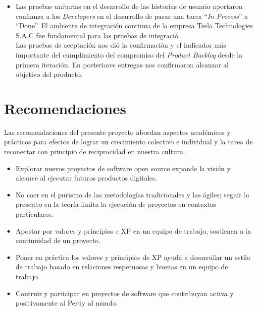 \begin{spacing}{1.5}
\begin{itemize}
	\item Las pruebas unitarias en el desarrollo de las historias de usuario aportaron confianza a los \textit{Developers} en el desarrollo de pasar una tarea ``\textit{In Process}'' a ``Done''. El ambiente de integraci\'{o}n continua de la empresa Tesla Technologies S.A.C fue fundamental para las pruebas de integraci\'{o}.\\
	Las pruebas de aceptaci\'{o}n nos di\'{o} la confirmaci\'{o}n y el indicador m\'{a}s importante del cumplimiento del compromiso del \textit{Product Backlog} desde la primera iteraci\'{o}n. En posteriores entregas nos confirmaron alcanzar al objetivo del producto.
	
\end{itemize}
\clearpage
\section{Recomendaciones}
	Las recomendaciones del presente proyecto abordan aspectos acad\'{e}micos y pr\'{a}cticos para efectos de lograr un crecimiento colectivo e individual y la tarea de reconectar con principio de reciprocidad en nuestra cultura.
	
	\begin{itemize}
		\item Explorar nuevos proyectos de software open source expande la visión y alcance al ejecutar futuros productos digitales.
		\item No caer en el purismo de las metodolog\'{i}as tradicionales y las \'{a}giles; seguir lo prescrito en la teor\'{i}a limita la ejecuci\'{o}n de proyectos en contextos particulares.
		\item Apostar por valores y principios e XP en un equipo de trabajo, sostienen a la continuidad de un proyecto.
		\item Poner en pr\'{a}ctica los valores y principios de XP ayuda a desarrollar un estilo de trabajo basado en relaciones respetuosas y buenas en un equipo de trabajo. 
		\item Contruir y participar en proyectos de software que contribuyan activa y positivamente al Per\'{u}y al mundo.
	\end{itemize}
\end{spacing}
